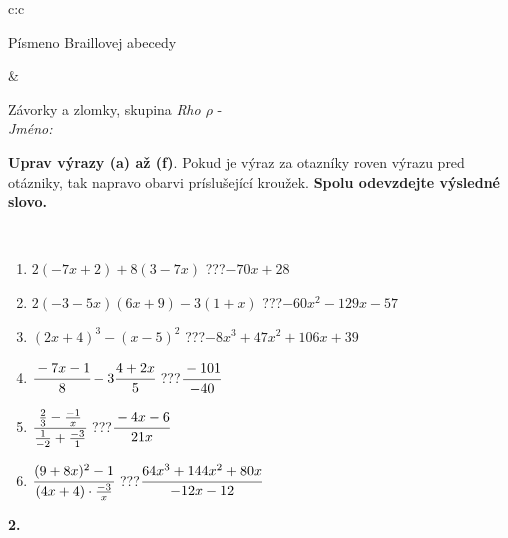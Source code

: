 \documentclass[10pt]{report}
\begin{document}
\begin{tabular}{c:c}
\begin{minipage}[c][104.5mm][t]{0.5\linewidth}
\begin{center}
\begin{minipage}{0.20\linewidth}
\begin{center}
{\small Písmeno Braillovej abecedy}
\end{center}
\end{minipage}
\end{center}
\end{minipage}
&
\begin{minipage}[c][104.5mm][t]{0.5\linewidth}
\begin{center}
\vspace{7mm}
{\huge Závorky a zlomky, skupina \textit{Rho $\rho$} -}\\[5mm]
\textit{Jméno:}\phantom{xxxxxxxxxxxxxxxxxxxxxxxxxxxxxxxxxxxxxxxxxxxxxxxxxxxxxxxxxxxxxxxxx}\\[5mm]
\begin{minipage}{0.95\linewidth}
\begin{center}
\textbf{Uprav výrazy (a) až (f)}. Pokud je výraz za otazníky roven výrazu pred otázniky, tak napravo obarvi príslušející kroužek. \textbf{Spolu odevzdejte výsledné slovo.}
\end{center}
\end{minipage}
\\[1mm]
\begin{minipage}{0.79\linewidth}
\begin{center}
\begin{varwidth}{\linewidth}
\begin{enumerate}
\normalsize
\item $2(-7x+2)+8(3-7x)$\quad \dotfill\; ???\;\dotfill \quad $-70x+28$
\item $2(-3-5x)(6x+9)-3(1+x)$\quad \dotfill\; ???\;\dotfill \quad $-60x^2-129x-57$
\item $(2x+4)^3-(x-5)^2$\quad \dotfill\; ???\;\dotfill \quad $-8x^3+47x^2+106x+39$
\item $\cfrac{-7x-1}{8}-3\cfrac{4+2x}{5}$\quad \dotfill\; ???\;\dotfill \quad $\cfrac{-101}{-40}$
\item $\cfrac{\frac{2}{3}-\frac{-1}{x}}{\frac{1}{-2}+\frac{-3}{1}}$\quad \dotfill\; ???\;\dotfill \quad $\cfrac{-4x-6}{21x}$
\item $\cfrac{(9+8x)^2-1}{(4x+4)\cdot\frac{-3}{x}}$\quad \dotfill\; ???\;\dotfill \quad $\cfrac{64x^3+144x^2+80x}{-12x-12}$
\end{enumerate}
\end{varwidth}
\end{center}
\end{minipage}
\begin{minipage}{0.20\linewidth}
\begin{center}
{\Huge\bfseries 2.} \\[2mm]

\end{center}
\end{minipage}
\end{center}
\end{minipage}
\end{tabular}
\end{document}
